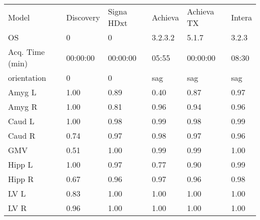 \begin{table}
\begin{tabular}{llllll}
Model                 &              Discovery &         Signa HDxt &                            Achieva &              Achieva TX &                      Intera \\
OS                    &                      0 &                  0 &                            3.2.3.2 &                   5.1.7 &                       3.2.3 \\
Acq. Time (min)       &               00:00:00 &           00:00:00 &                           05:55 &                00:00:00 &                    08:30 \\
orientation           &                      0 &                  0 &                                sag &                     sag &                         sag \\
\midrule
Amyg L                &                   1.00 &               0.89 &                               0.40 &                    0.87 &                        0.97 \\
Amyg R                &                   1.00 &               0.81 &                               0.96 &                    0.94 &                        0.96 \\
Caud L                &                   1.00 &               0.98 &                               0.99 &                    0.98 &                        0.99 \\
Caud R                &                   0.74 &               0.97 &                               0.98 &                    0.97 &                        0.96 \\
GMV                   &                   0.51 &               1.00 &                               0.99 &                    0.99 &                        1.00 \\
Hipp L                &                   1.00 &               0.97 &                               0.77 &                    0.90 &                        0.99 \\
Hipp R                &                   0.67 &               0.96 &                               0.97 &                    0.96 &                        0.98 \\
LV L                  &                   0.83 &               1.00 &                               1.00 &                    1.00 &                        1.00 \\
LV R                  &                   0.96 &               1.00 &                               1.00 &                    1.00 &                        1.00 \\

\end{tabular}
\end{table}
